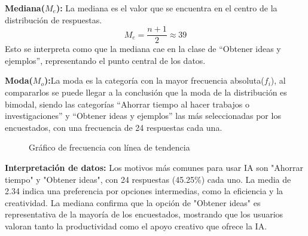\textbf{Mediana($M_e$):} La mediana es el valor que se encuentra en el centro de la distribución de respuestas.
\begin{equation*}
	M_e = \frac{n + 1}{2} \approx 39
\end{equation*}
Esto se interpreta como que la mediana cae en la clase de “Obtener ideas y ejemplos”, representando el punto central de los datos.

\textbf{Moda($M_o$):}La moda es la categoría con la mayor frecuencia absoluta($f_i$), al compararlos se puede llegar a la conclusión que la moda de la distribución es bimodal, siendo las categorías “Ahorrar tiempo al hacer trabajos o investigaciones” y “Obtener ideas y ejemplos” las más seleccionadas por los encuestados, con una frecuencia de 24 respuestas cada una.
\begin{figure}[H]
	\centering
	\hspace*{-1.5cm}
	\caption{Gráfico de frecuencia con línea de tendencia}
\end{figure}

\textbf{Interpretación de datos:} Los motivos más comunes para usar IA son "Ahorrar tiempo" y "Obtener ideas", con 24 respuestas (45.25\%) cada uno. La media de 2.34 indica una preferencia por opciones intermedias, como la eficiencia y la creatividad. La mediana confirma que la opción de "Obtener ideas" es representativa de la mayoría de los encuestados, mostrando que los usuarios valoran tanto la productividad como el apoyo creativo que ofrece la IA.
